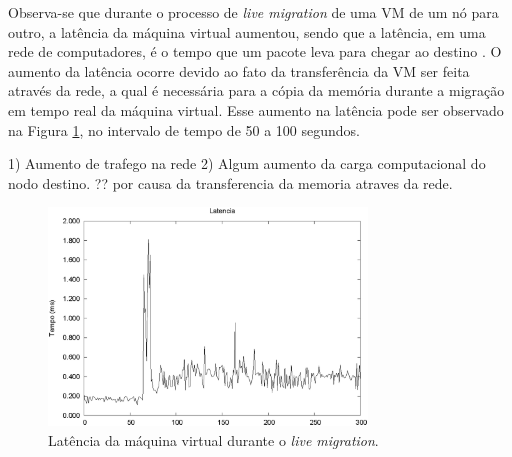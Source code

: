 % 

Observa-se que durante o processo de \textit{live migration} de uma \ac{VM} de um nó para outro, a latência da máquina virtual aumentou, 
sendo que a latência, em uma rede de computadores, é o tempo que um pacote leva para chegar ao destino \cite{geordano2014}.
O aumento da latência ocorre devido ao fato da transferência da \ac{VM} ser feita através da rede, a qual é necessária para a cópia da memória 
durante a migração em tempo real da máquina virtual. 
Esse aumento na latência pode ser observado na Figura \ref{fig:teste2_latencia}, no intervalo de tempo de 50 a 100 segundos.

1) Aumento de trafego na rede
2) Algum aumento da carga computacional do nodo destino.
?? por causa da transferencia da memoria atraves da rede.


\begin{figure}[h!]
 \centering
 \includegraphics[width=320px]{img/teste2_latencia.eps}
 \caption{Latência da máquina virtual durante o \textit{live migration}.}
 \label{fig:teste2_latencia}
\end{figure}


